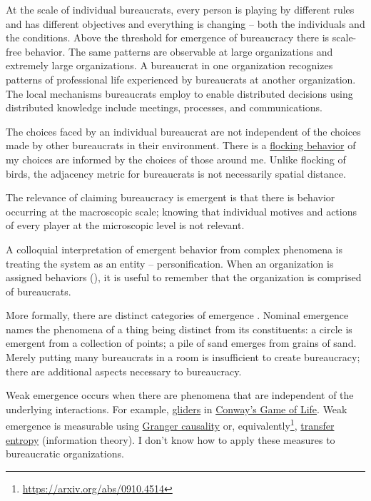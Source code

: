At the scale of individual bureaucrats, every person is playing by different rules and has different objectives and everything is changing -- both the individuals and the conditions. 
Above the threshold for emergence of bureaucracy there is scale-free behavior. The same patterns are observable at large organizations and extremely large organizations. A bureaucrat in one organization recognizes patterns of professional life experienced by bureaucrats at another organization. The local mechanisms bureaucrats employ to enable distributed decisions using distributed knowledge include meetings, processes, and communications. 

The choices faced by an individual bureaucrat are not independent of the choices made by other bureaucrats in their environment. There is a \href{https://en.wikipedia.org/wiki/Flocking_(behavior)}{flocking behavior} of my choices are informed by the choices of those around me. Unlike flocking of birds, the adjacency metric for bureaucrats is not necessarily spatial distance.


The relevance of claiming bureaucracy is emergent is that there is behavior occurring at the macroscopic scale; knowing that individual motives and actions of every player at the microscopic level is not relevant.


A colloquial interpretation of emergent behavior from complex phenomena is treating the system as an entity -- personification. When an organization is assigned behaviors (\cite{2002_Gall}), it is useful to remember that the organization is comprised of bureaucrats. 


More formally, there are distinct categories of emergence \cite{2002_Bedau}. Nominal emergence names the phenomena of a thing being distinct from its constituents: a circle is emergent from a collection of points; a pile of sand emerges from grains of sand. Merely putting many bureaucrats in a room is insufficient to create bureaucracy; there are additional aspects necessary to bureaucracy. 

Weak emergence occurs when there are phenomena that are independent of the underlying interactions. For example, \href{https://en.wikipedia.org/wiki/Glider_(Conway\%27s_Life)}{gliders} in \href{https://en.wikipedia.org/wiki/Conway\%27s_Game_of_Life}{Conway's Game of Life}.
Weak emergence is measurable using \href{https://en.wikipedia.org/wiki/Granger_causality}{Granger causality} or, equivalently\footnote{\href{https://arxiv.org/abs/0910.4514}{https://arxiv.org/abs/0910.4514}}, \href{https://en.wikipedia.org/wiki/Transfer_entropy}{transfer entropy} (information theory). I don't know how to apply these measures to bureaucratic organizations. 

